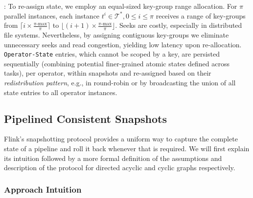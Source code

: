 : To re-assign state, we employ an equal-sized  key-group range allocation. For $\pi$ parallel instances, each instance $t^i \in \mathcal{T^*}, 0\leq i \leq \pi$ receives a range of key-groups from $\lceil i \times \frac{\pi\text{-max}}{\pi} \rceil$ to $\lfloor (i+1) \times \frac{\pi\text{-max}}{\pi} \rfloor$. Seeks are costly, especially in distributed file systems. Nevertheless, by assigning contiguous key-groups we eliminate unnecessary seeks and read congestion, yielding low latency upon re-allocation. 
\texttt{Operator-State} entries, which cannot be scoped by a key, are persisted sequentially (combining potential finer-grained atomic states defined across tasks), per operator, within snapshots and re-assigned based on their \emph{redistribution pattern}, e.g., in round-robin or by broadcasting the union of all state entries to all operator instances.


\subsection{Pipelined Consistent Snapshots}
\label{sec:snapshots}

Flink's snapshotting protocol provides a uniform way to capture the complete state of a pipeline and roll it back whenever that is required. We will first explain its intuition followed by a more formal definition of the assumptions and description of the protocol for directed acyclic and cyclic graphs respectively.


\subsubsection{Approach Intuition}

